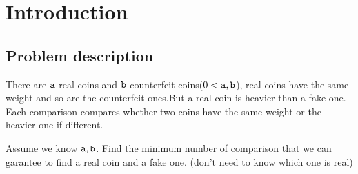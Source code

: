 \section{Introduction}
\subsection*{Problem description}
There are $\mathtt{a}$ real coins and $\mathtt{b}$ counterfeit coins($0<\mathtt{a},\mathtt{b}$),  real coins have the same weight and so are the counterfeit ones.But a real coin is heavier than a fake one.
Each comparison compares whether two coins have the same weight or the heavier one if different.

Assume we know $\mathtt{a},\mathtt{b}$.
Find the minimum number of comparison that we can garantee to find a real coin and a fake one. (don't need to know which one is real)
